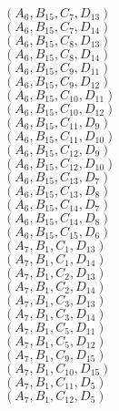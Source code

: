 \documentclass[14pt]{article}
\begin{document}
    $({A}_{6}, {B}_{15}, {C}_{7}, {D}_{13}) $ \\ 
    $({A}_{6}, {B}_{15}, {C}_{7}, {D}_{14}) $ \\ 
    $({A}_{6}, {B}_{15}, {C}_{8}, {D}_{13}) $ \\ 
    $({A}_{6}, {B}_{15}, {C}_{8}, {D}_{14}) $ \\ 
    $({A}_{6}, {B}_{15}, {C}_{9}, {D}_{11}) $ \\ 
    $({A}_{6}, {B}_{15}, {C}_{9}, {D}_{12}) $ \\ 
    $({A}_{6}, {B}_{15}, {C}_{10}, {D}_{11}) $ \\ 
    $({A}_{6}, {B}_{15}, {C}_{10}, {D}_{12}) $ \\ 
    $({A}_{6}, {B}_{15}, {C}_{11}, {D}_{9}) $ \\ 
    $({A}_{6}, {B}_{15}, {C}_{11}, {D}_{10}) $ \\ 
    $({A}_{6}, {B}_{15}, {C}_{12}, {D}_{9}) $ \\ 
    $({A}_{6}, {B}_{15}, {C}_{12}, {D}_{10}) $ \\ 
    $({A}_{6}, {B}_{15}, {C}_{13}, {D}_{7}) $ \\ 
    $({A}_{6}, {B}_{15}, {C}_{13}, {D}_{8}) $ \\ 
    $({A}_{6}, {B}_{15}, {C}_{14}, {D}_{7}) $ \\ 
    $({A}_{6}, {B}_{15}, {C}_{14}, {D}_{8}) $ \\ 
    $({A}_{6}, {B}_{15}, {C}_{15}, {D}_{6}) $ \\ 
    $({A}_{7}, {B}_{1}, {C}_{1}, {D}_{13}) $ \\ 
    $({A}_{7}, {B}_{1}, {C}_{1}, {D}_{14}) $ \\ 
    $({A}_{7}, {B}_{1}, {C}_{2}, {D}_{13}) $ \\ 
    $({A}_{7}, {B}_{1}, {C}_{2}, {D}_{14}) $ \\ 
    $({A}_{7}, {B}_{1}, {C}_{3}, {D}_{13}) $ \\ 
    $({A}_{7}, {B}_{1}, {C}_{3}, {D}_{14}) $ \\ 
    $({A}_{7}, {B}_{1}, {C}_{5}, {D}_{11}) $ \\ 
    $({A}_{7}, {B}_{1}, {C}_{5}, {D}_{12}) $ \\ 
    $({A}_{7}, {B}_{1}, {C}_{9}, {D}_{15}) $ \\ 
    $({A}_{7}, {B}_{1}, {C}_{10}, {D}_{15}) $ \\ 
    $({A}_{7}, {B}_{1}, {C}_{11}, {D}_{5}) $ \\ 
    $({A}_{7}, {B}_{1}, {C}_{12}, {D}_{5}) $ \\ 
\end{document}

